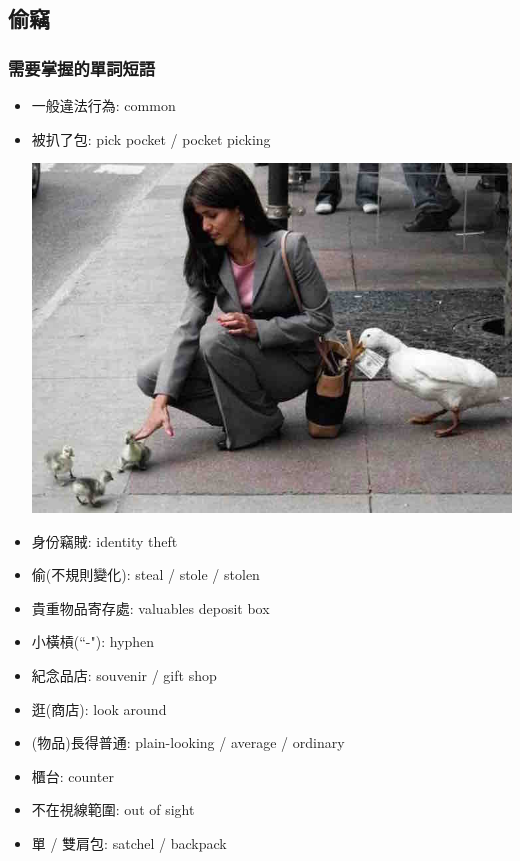 \subsection{偷竊}
\subsubsection*{需要掌握的單詞短語}
\begin{multicols}{2}
\begin{itemize}
  \itemsep0em
  \item 一般違法行為: common 
  \item 被扒了包: pick pocket / pocket picking
  \begin{center}
    \includegraphics[scale=.3]{pics/pick-pocket}
  \end{center}
  \item 身份竊賊: identity theft
  \item 偷(不規則變化): steal / stole / stolen
  \item 貴重物品寄存處: valuables deposit box
  \item 小橫槓(``-"): hyphen
  \item 紀念品店: souvenir / gift shop
  \item 逛(商店): look around
  \item (物品)長得普通: plain-looking / average / ordinary
  \item 櫃台: counter
  \item 不在視線範圍: out of sight
  \item 單 / 雙肩包: satchel / backpack
\end{itemize}
\end{multicols}

